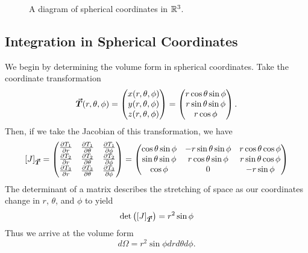 \begin{figure}[H]
	\label{fig:spherical_coordinates}
	\centering
	\def\svgwidth{0.6\textwidth}
		
		\caption{A diagram of spherical coordinates in $\mathbb{R}^3$.}
\end{figure}

\subsection{Integration in Spherical Coordinates}

We begin by determining the volume form in spherical coordinates. Take the coordinate transformation
\[
\boldsymbol{\vec{T}}(r,\theta,\phi) = \begin{pmatrix} x(r,\theta,\phi) \\ y(r,\theta,\phi) \\ z(r,\theta,\phi) \end{pmatrix} = \begin{pmatrix} r \cos\theta \sin \phi \\ r \sin \theta \sin \phi \\ r\cos \phi \end{pmatrix}.
\]
Then, if we take the Jacobian of this transformation, we have
\[
[J]_{\boldsymbol{\vec{T}}} = \begin{pmatrix} \frac{\partial T_1}{\partial r} & \frac{\partial T_1}{\partial \theta} & \frac{\partial T_1}{\partial \phi} \\ \frac{\partial T_2}{\partial r} & \frac{\partial T_2}{\partial \theta} & \frac{\partial T_2}{\partial \phi} \\ \frac{\partial T_3}{\partial r} & \frac{\partial T_3}{\partial \theta} & \frac{\partial T_3}{\partial \phi}  \end{pmatrix} =  \begin{pmatrix} \cos \theta \sin \phi & -r\sin \theta \sin \phi & r\cos \theta \cos \phi \\ \sin \theta \sin \phi & r\cos \theta \sin \phi & r \sin \theta \cos \phi \\ \cos \phi & 0 & -r\sin \phi \end{pmatrix}
\]
The determinant of a matrix describes the stretching of space as our coordinates change in $r$, $\theta$, and $\phi$ to yield
\[
\det \left( [J]_{\boldsymbol{\vec{T}}}\right) = r^2 \sin \phi
\]
Thus we arrive at the volume form 
\[
d\Omega = r^2 \sin \phi dr d\theta d\phi.
\]
